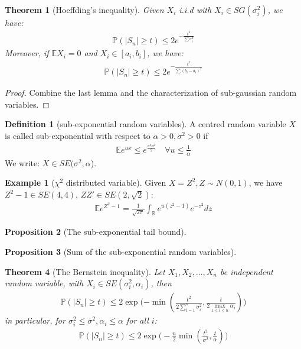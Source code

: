 \documentclass[a4paper,12pt, oneside, fleqn]{book}
\newtheorem{theorem}{Theorem}[section]
\newtheorem{proposition}[theorem]{Proposition}
\theoremstyle{definition}
\newtheorem{definition}{Definition}[section]
\newtheorem*{example}{Example}
\theoremstyle{remark}
\begin{document}
\begin{theorem}[Hoeffding's inequality]
	Given $X_i$ i.i.d with $X_i \in SG(\sigma_i^2)$, we have:
	\begin{align*}
		\mathbb{P}(|S_n| \geq t) \leq 2e^{-\frac{t^2}{\sum\sigma_i^2}} 
	\end{align*}
	Moreover, if $\mathbb{E}X_i = 0$ and $X_i \in [a_i, b_i]$, we have:
	\begin{align*}
		\mathbb{P}(|S_n| \geq t) \leq 2e^{-\frac{t^2}{\sum(b_i - a_i)^2}}
	\end{align*}
\end{theorem}
\begin{proof}
	Combine the last lemma and the characterization of sub-gaussian random variables.
\end{proof}

\begin{definition}[sub-exponential random variables]
	A centred random variable $X$ is called sub-exponential with respect to $\alpha > 0, \sigma^2 > 0$ if
\begin{align*}
	\mathbb{E} e^{ux} \leq e^{\frac{u^2 \sigma^2}{2}} \quad \forall u \le \frac{1}{\alpha}
\end{align*}
We write: $X \in SE(\sigma^2, \alpha$).
\end{definition}

\begin{example}[$\chi^2$ distributed variable]
	Given $X = Z^2, Z\sim N(0, 1)$, we have $Z^2 - 1 \in SE(4, 4)$, $ZZ' \in SE(2, \sqrt{2})$:
	\begin{align*}
		\mathbb{E}e^{Z^2 - 1} = \frac{1}{\sqrt{2\pi}} \int_\mathbb{R} e^{u(z^2 - 1)}e^{-z^2}dz
	\end{align*}
\end{example}

\begin{proposition}[The sub-exponential tail bound]
\end{proposition}

\begin{proposition}[Sum of the sub-exponential random variables]
\end{proposition}

\begin{theorem}[The Bernstein inequality]
Let $X_1, X_2, \dots, X_n$ be independent random variable, with $X_i \in SE(\sigma_i^2, \alpha_i)$, then
\begin{align*}
	\mathbb{P}(|S_n| \ge t ) \le 2 \exp \bigg( {-\min(\frac{t^2}{2\sum_{i = 1}^n \sigma_i^2}, \frac{t}{2\max_{1 \le i \le n} \alpha_i})}\bigg)
\end{align*}
in particular, for $\sigma_i^2 \le \sigma^2, \alpha_i \le \alpha$ for all $i$:
\begin{align*}
	\mathbb{P}(|S_n| \ge t) \le 2 \exp\bigg(-\frac{n}{2} \min(\frac{t^2}{\sigma^2}, \frac{t}{\alpha}) \bigg)
\end{align*}
\end{theorem}
\end{document}
